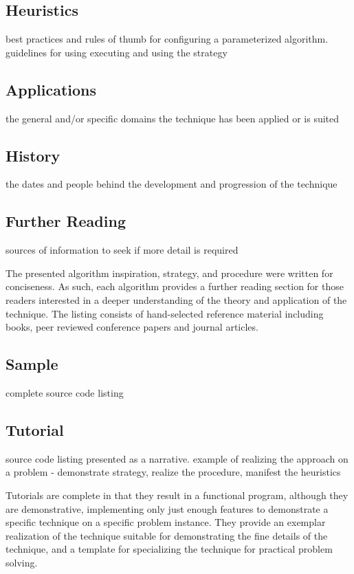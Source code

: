 \documentclass[a4paper, 11pt]{article}
\begin{document}
\subsection{Heuristics}
best practices and rules of thumb for configuring a parameterized algorithm. guidelines for using executing and using the strategy

\subsection{Applications}
the general and/or specific domains the technique has been applied or is suited

\subsection{History}
the dates and people behind the development and progression of the technique

\subsection{Further Reading}
sources of information to seek if more detail is required

The presented algorithm inspiration, strategy, and procedure were written for conciseness. As such, each algorithm provides a further reading section for those readers interested in a deeper understanding of the theory and application of the technique. The listing consists of hand-selected reference material including books, peer reviewed conference papers and journal articles.

\subsection{Sample}
complete source code listing

\subsection{Tutorial}
source code listing presented as a narrative. example of realizing the approach on a problem - demonstrate strategy, realize the procedure, manifest the heuristics

Tutorials are complete in that they result in a functional program, although they are demonstrative, implementing only just enough features to demonstrate a specific technique on a specific problem instance. They provide an exemplar realization of the technique suitable for demonstrating the fine details of the technique, and a template for specializing the technique for practical problem solving. 
\end{document}
